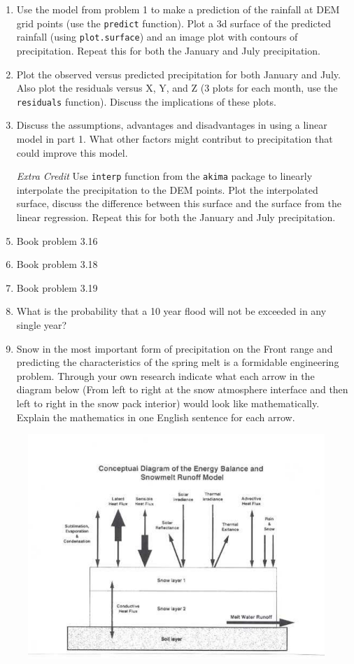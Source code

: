 \documentclass[11pt]{article}
\begin{document}
\begin{enumerate}
\item Use the model from problem 1 to make a prediction of the rainfall at DEM grid points (use the \texttt{predict} function).  Plot a 3d surface of the predicted rainfall (using \texttt{plot.surface}) and an image plot with contours of precipitation. Repeat this for both the January and July precipitation. 

\item Plot the observed versus predicted precipitation for both January and July. Also plot the residuals versus X, Y, and Z (3 plots for each month, use the \texttt{residuals} function). Discuss the implications of these plots. 

\item Discuss the assumptions, advantages and disadvantages in using a linear model in part 1.  What other factors might contribut to precipitation that could improve this model. 

\item[{\it Extra Credit}] Use \texttt{interp} function from the \texttt{akima} package to linearly interpolate the precipitation to the DEM points.  Plot the interpolated surface, discuss the difference between this surface and the surface from the linear regression. Repeat this for both the January and July precipitation. 

\item Book problem 3.16
\item Book problem 3.18
\item Book problem 3.19
\item What is the probability that a 10 year flood will not be exceeded in any single year?
\item Snow in the most important form of precipitation on the Front range and predicting the characteristics of the spring melt is a formidable engineering problem. Through your own research indicate what each arrow in the diagram below (From left to right at the snow atmosphere interface and then left to right in the snow pack interior) would look like mathematically. Explain the mathematics in one English sentence for each arrow.

\end{enumerate}

\begin{figure}[htbp] %
   \centering
   \includegraphics{snowmodel.pdf} 
\end{figure}
\end{document}
